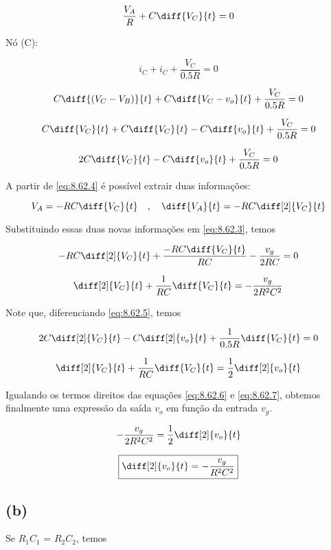 \begin{equation}\label{eq:8.62.4}
    \frac{V_A}{R} + C\diff{V_C}{t} = 0
\end{equation}

Nó (C): 

\[ i_C + i_C + \frac{V_C}{0.5R} = 0 \]

\[ C\diff{(V_C - V_B)}{t} + C\diff{V_C - v_o}{t} + \frac{V_C}{0.5R} = 0 \]

\[ C\diff{V_C}{t} + C\diff{V_C}{t} - C\diff{v_o}{t} + \frac{V_C}{0.5R} = 0 \]

\begin{equation}\label{eq:8.62.5}
    2C\diff{V_C}{t} - C\diff{v_o}{t} + \frac{V_C}{0.5R} = 0
\end{equation}

A partir de \eqref{eq:8.62.4} é possível extrair duas informações: 

\[ V_A = - RC\diff{V_C}{t} \quad , \quad \diff{V_A}{t} = - RC\diff[2]{V_C}{t}  \]

Substituindo essas duas novas informações em \eqref{eq:8.62.3}, temos  

\[ - RC\diff[2]{V_C}{t} + \frac{- RC\diff{V_C}{t}}{RC} - \frac{v_g}{2RC} = 0 \]

\begin{equation}\label{eq:8.62.6}
    \diff[2]{V_C}{t} + \frac{1}{RC} \diff{V_C}{t} = - \frac{v_g}{2R^2C^2}
\end{equation}

Note que, diferenciando \eqref{eq:8.62.5}, temos  

\[ 2C\diff[2]{V_C}{t} - C\diff[2]{v_o}{t} + \frac{1}{0.5R} \diff{V_C}{t} = 0 \]

\begin{equation}\label{eq:8.62.7}
    \diff[2]{V_C}{t} + \frac{1}{RC} \diff{V_C}{t} = \frac{1}{2}\diff[2]{v_o}{t}
\end{equation}

Igualando os termos direitos das equações \eqref{eq:8.62.6} e \eqref{eq:8.62.7}, obtemos finalmente uma expressão da saída  
$v_o$ em função da entrada $v_g$.

\[  - \frac{v_g}{2R^2C^2} = \frac{1}{2}\diff[2]{v_o}{t} \]

\[ \boxed{\diff[2]{v_o}{t} = - \frac{v_g}{R^2C^2} } \]

\subsection*{(b)}

Se $R_1C_1$ = $R_2C_2$, temos  

